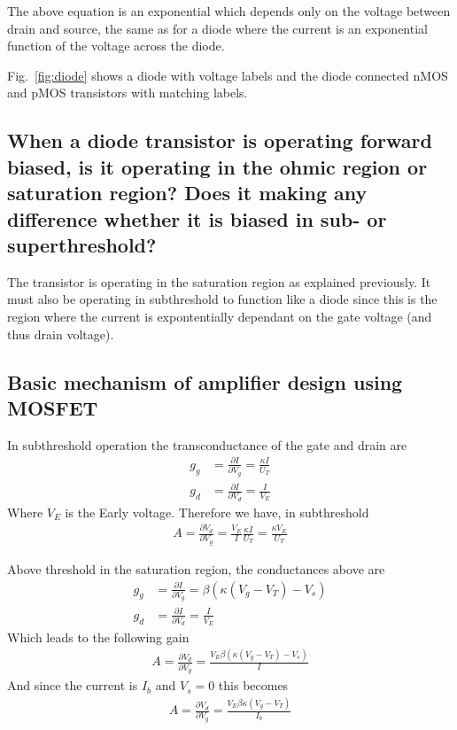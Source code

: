 The above equation is an exponential which depends only on the voltage between drain and source, the same as for
a diode where the current is an exponential function of the voltage across the diode.

Fig.~\ref{fig:diode} shows a diode with voltage labels and the diode connected nMOS and pMOS transistors with matching 
labels.

\subsection{When a diode transistor is operating forward biased, is it operating in the ohmic region or saturation region? 
Does it making any difference whether it is biased in sub- or superthreshold?}
The transistor is operating in the saturation region as explained previously. It must also be operating in subthreshold to function like
a diode since this is the region where the current is expontentially dependant on the gate voltage (and thus drain voltage).

\subsection{Basic mechanism of amplifier design using MOSFET}
In subthreshold operation the transconductance of the gate and drain are
\begin{align*}
    g_g &= \frac{\partial I}{\partial V_g} = \frac{\kappa I}{U_T} \\
    g_d &= \frac{\partial I}{\partial V_d} = \frac{I}{V_E}
\end{align*}
Where \(V_E\) is the Early voltage. Therefore we have, in subthreshold
\begin{align*}
    A = \frac{\partial V_d}{\partial V_g} = \frac{V_E}{I}\frac{\kappa I}{U_T} = \frac{\kappa V_E }{U_T}
\end{align*}

Above threshold in the saturation region, the conductances above are
\begin{align*}
    g_g &= \frac{\partial I}{\partial V_g} = \beta\left(\kappa\left(V_g - V_T\right) - V_s\right) \\
    g_d &= \frac{\partial I}{\partial V_d} = \frac{I}{V_E}
\end{align*}
Which leads to the following gain
\begin{align*}
    A = \frac{\partial V_d}{\partial V_g} = \frac{V_E\beta\left(\kappa\left(V_g - V_T\right) - V_s\right)}{I} 
\end{align*}
And since the current is \(I_b\) and \(V_s=0\) this becomes
\begin{align*}
    A = \frac{\partial V_d}{\partial V_g} = \frac{V_E\beta\kappa\left(V_g - V_T\right)}{I_b} 
\end{align*}


